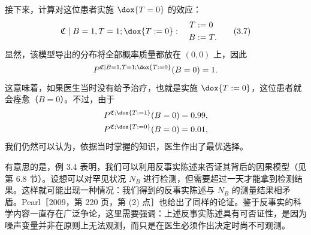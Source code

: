 \begin{example}[眼病]
接下来，计算对这位患者实施 $\dox{T=0}$ 的效应：
\begin{equation}
 \mathfrak{C}\mid B=1,T=1;\dox{T:=0}:\quad
 \begin{aligned}
 T&:=0\\
 B&:=T.
 \end{aligned}
 \tag{3.7}
\end{equation}
显然，该模型导出的分布将全部概率质量都放在 $(0,0)$ 上，因此
\[
 P^{\mathfrak{C}\mid B=1,T=1;\dox{T:=0}}(B=0)=1.
\]
这意味着，如果医生当时没有给予治疗，也就是实施 $\dox{T:=0}$，这位患者就会痊愈（$B=0$）。不过，由于
\[
 \begin{aligned}
 P^{\mathfrak{C};\dox{T:=1}}(B=0)&=0.99,\\
 P^{\mathfrak{C};\dox{T:=0}}(B=0)&=0.01,
 \end{aligned}
\]
我们仍然可以认为，依据当时掌握的知识，医生作出了最优选择。
\end{example}

有意思的是，例 3.4 表明，我们可以利用反事实陈述来否证其背后的因果模型（见第 6.8 节）。设想可以对罕见状况 $N_B$ 进行检测，但需要超过一天才能拿到检测结果。这样就可能出现一种情况：我们得到的反事实陈述与 $N_B$ 的测量结果相矛盾。Pearl［2009，第 220 页，第 (2) 点］也给出了同样的论证。鉴于反事实的科学内容一直存在广泛争论，这里需要强调：上述反事实陈述具有可否证性，是因为噪声变量并非在原则上无法观测，而只是在医生必须作出决定时尚不可观测。
